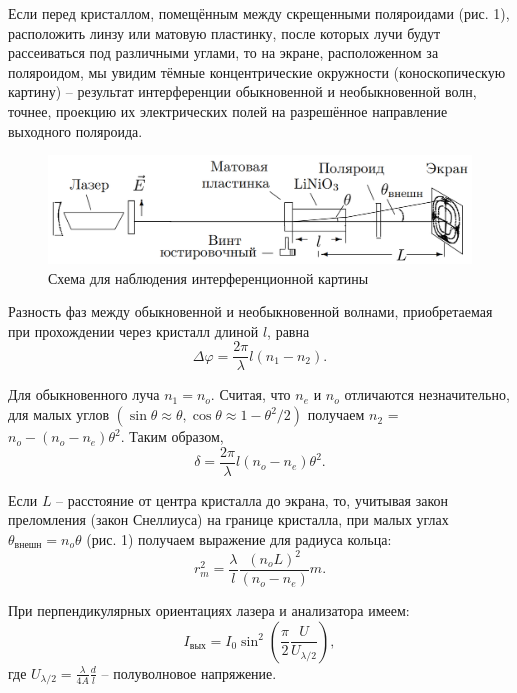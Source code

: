 \documentclass[12pt,a4paper]{article}
\begin{document}
	Если перед кристаллом, помещённым между скрещенными поляроидами (рис. 1), расположить линзу или матовую пластинку, после которых лучи будут рассеиваться под различными углами, то на экране, расположенном за поляроидом, мы увидим тёмные концентрические окружности (коноскопическую картину) -- результат интерференции обыкновенной и необыкновенной волн, точнее, проекцию их электрических полей на разрешённое направление выходного поляроида.
	
	\begin{figure}
		\centering
		\includegraphics[width=\linewidth]{res/scheme}
		\caption{Схема для наблюдения интерференционной картины}
	\end{figure}


	Разность фаз между обыкновенной и необыкновенной волнами, приобретаемая при прохождении через кристалл длиной $l$, равна
	\begin{equation}
		\Delta \varphi = \frac{2\pi}{\lambda} l (n_1 - n_2).
	\end{equation}


	Для обыкновенного луча $n_1 = n_o$. Считая, что $n_e$ и $n_o$ отличаются незначительно, для малых углов $(\sin\theta \approx \theta, \cos\theta \approx 1 - \theta^2/2)$ получаем $n_2$ = $n_o - (n_o - n_e)\theta^2$. Таким образом,
	\begin{equation}
		\delta = \frac{2\pi}{\lambda}l(n_o - n_e)\theta^2.
	\end{equation}


	Если $L$ -- расстояние от центра кристалла до экрана, то, учитывая закон преломления (закон Снеллиуса) на границе кристалла, при малых углах $\theta_{\text{внешн}} = n_o \theta$ (рис. 1) получаем выражение для радиуса кольца:
	\begin{equation}
		r_m^2 = \frac{\lambda}{l}\frac{(n_o L)^2}{(n_o - n_e)}m.
	\end{equation}


	При перпендикулярных ориентациях лазера и анализатора имеем:
	\begin{equation}
		I_{\text{вых}} = I_0\sin^2\left(\frac{\pi}{2}\frac{U}{U_{\lambda / 2}}\right), 
	\end{equation}
	где $U_{\lambda / 2} = \frac{\lambda}{4A} \frac{d}{l}$ -- полуволновое напряжение.
\end{document}
